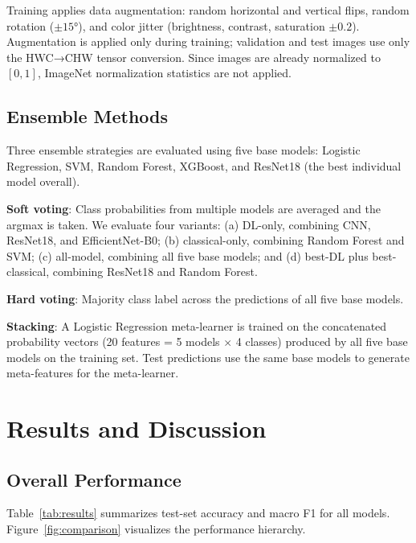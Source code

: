 \documentclass[12pt, a4paper]{article}
\begin{document}
Training applies data augmentation: random horizontal and vertical flips, random rotation ($\pm 15°$), and color jitter (brightness, contrast, saturation $\pm 0.2$). Augmentation is applied only during training; validation and test images use only the HWC→CHW tensor conversion. Since images are already normalized to $[0,1]$, ImageNet normalization statistics are not applied.

\subsection{Ensemble Methods}

Three ensemble strategies are evaluated using five base models: Logistic Regression, SVM, Random Forest, XGBoost, and ResNet18 (the best individual model overall).

\textbf{Soft voting}: Class probabilities from multiple models are averaged and the argmax is taken. We evaluate four variants: (a) DL-only, combining CNN, ResNet18, and EfficientNet-B0; (b) classical-only, combining Random Forest and SVM; (c) all-model, combining all five base models; and (d) best-DL plus best-classical, combining ResNet18 and Random Forest.

\textbf{Hard voting}: Majority class label across the predictions of all five base models.

\textbf{Stacking}: A Logistic Regression meta-learner is trained on the concatenated probability vectors (20 features = 5 models $\times$ 4 classes) produced by all five base models on the training set. Test predictions use the same base models to generate meta-features for the meta-learner.

\section{Results and Discussion}

\subsection{Overall Performance}

Table~\ref{tab:results} summarizes test-set accuracy and macro F1 for all models. Figure~\ref{fig:comparison} visualizes the performance hierarchy.
\end{document}
